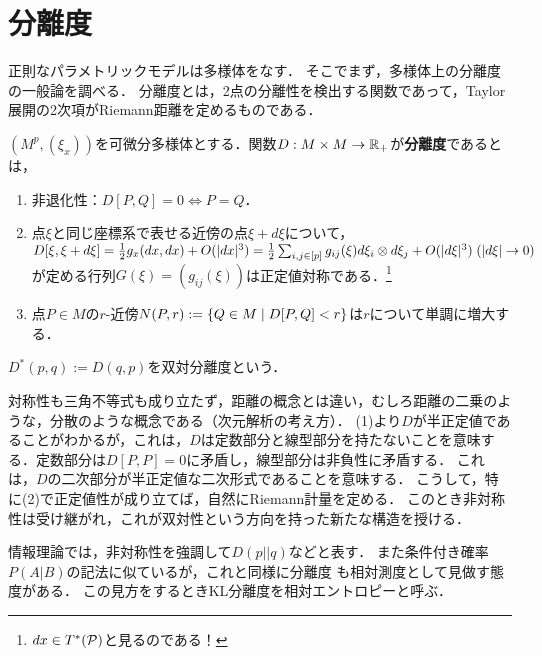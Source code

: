 \documentclass[uplatex,dvipdfmx]{jsreport}
\begin{document}
\section{分離度}

\begin{tcolorbox}[colframe=ForestGreen, colback=ForestGreen!10!white,breakable,colbacktitle=ForestGreen!40!white,coltitle=black,fonttitle=\bfseries\sffamily,
title=]
    正則なパラメトリックモデルは多様体をなす．
    そこでまず，多様体上の分離度の一般論を調べる．
    分離度とは，2点の分離性を検出する関数であって，Taylor展開の2次項がRiemann距離を定めるものである．
\end{tcolorbox}

\begin{definition}[divergence]
    $(M^p,(\xi_x))$を可微分多様体とする．関数$D:M\times M\to\R_+$が\textbf{分離度}であるとは，
    \begin{enumerate}
        \item 非退化性：$D[P,Q]=0\Leftrightarrow P=Q$．
        \item 点$\xi$と同じ座標系で表せる近傍の点$\xi+d\xi$について，$D[\xi,\xi+d\xi]=\frac{1}{2}g_x(dx,dx)+O(\abs{dx}^3)=\frac{1}{2}\sum_{i,j\in[p]}g_{ij}(\xi)d\xi_i\otimes d\xi_j+O(\abs{d\xi}^3)\;(\abs{d\xi}\to0)$が定める行列$G(\xi)=(g_{ij}(\xi))$は正定値対称である．\footnote{$dx\in T^*(\P)$と見るのである！}
        \item 点$P\in M$の$r$-近傍$N(P,r):=\Brace{Q\in M\mid D[P,Q]<r}$は$r$について単調に増大する．
    \end{enumerate}
    $D^*(p,q):=D(q,p)$を双対分離度という．
\end{definition}
\begin{remarks}
    対称性も三角不等式も成り立たず，距離の概念とは違い，むしろ距離の二乗のような，分散のような概念である（次元解析の考え方）．
    (1)より$D$が半正定値であることがわかるが，これは，$D$は定数部分と線型部分を持たないことを意味する．定数部分は$D[P,P]=0$に矛盾し，線型部分は非負性に矛盾する．
    これは，$D$の二次部分が半正定値な二次形式であることを意味する．
    こうして，特に(2)で正定値性が成り立てば，自然にRiemann計量を定める．
    このとき非対称性は受け継がれ，これが双対性という方向を持った新たな構造を授ける．
\end{remarks}
\begin{remark}
    情報理論では，非対称性を強調して$D(p||q)$などと表す．
    また条件付き確率$P(A|B)$の記法に似ているが，これと同様に分離度
    も相対測度として見做す態度がある．
    この見方をするときKL分離度を相対エントロピーと呼ぶ．
\end{remark}
\end{document}
